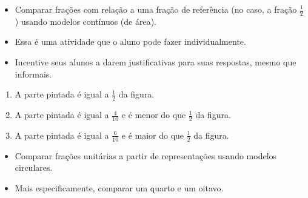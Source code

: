 \newpage
\begin{multicols}{2}

  \begin{objetivos}{}{}
  \begin{itemize} %
    \item       Comparar frações com relação a uma fração de referência (no caso, a fração       $\frac{1}{2}$) usando modelos contínuos (de área).
\end{itemize} %


\end{objetivos}

\begin{orientacoes}
  \begin{itemize} %
    \item       Essa é uma atividade que o aluno pode fazer individualmente.
    \item       Incentive seus alunos a darem justificativas para suas respostas, mesmo que informais.
\end{itemize} %


  \vspace{.1cm}

\end{orientacoes}

\begin{solucao}{}{}
\begin{enumerate} [\quad a)] %
    \item       A parte pintada é igual a       $\frac{1}{2}$ da figura.
    \item       A parte pintada é igual a       $\frac{4}{10}$ e é menor do que       $\frac{1}{2}$ da figura.
    \item       A parte pintada é igual a       $\frac{6}{10}$ e é maior do que       $\frac{1}{2}$ da figura.
\end{enumerate} %

\end{solucao}

\begin{objetivos}{}{}
  \begin{itemize} %
    \item       Comparar frações unitárias a partir de representações usando modelos circulares.
    \item       Mais especificamente, comparar um quarto e um oitavo.
\end{itemize} %


\end{objetivos}
\end{multicols}

